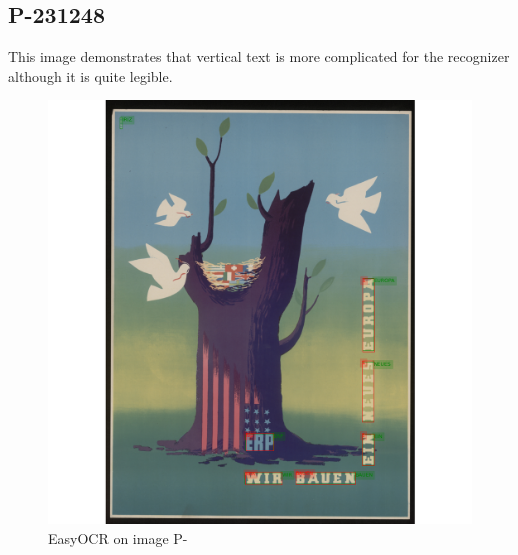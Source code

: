 \subsection*{P-231248}
This image demonstrates that vertical text is more complicated for the recognizer although it is quite legible.

\begin{figure}[hbtp!]
    \centering
    \includegraphics[width=\textwidth]{obrazky/plakaty/result_easyOCR_vienna1_split_tuning_special_sensitive-60verticaltextproblem.png}
    \caption{EasyOCR on image P-}
    \label{Im7:ex:easy}
\end{figure}




